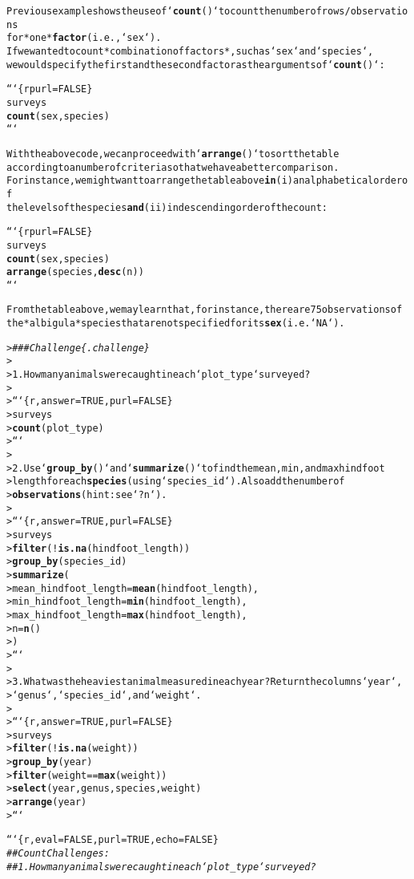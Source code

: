 \documentclass{article}\usepackage[]{graphicx}\usepackage[]{xcolor}
\makeatletter
\newcommand{\hlcom}[1]{\textcolor[rgb]{0.678,0.584,0.686}{\textit{#1}}}%
\newcommand{\hlkwd}[1]{\textcolor[rgb]{0.737,0.353,0.396}{\textbf{#1}}}%
\newenvironment{kframe}{%
 \def\at@end@of@kframe{}%
 \ifinner\ifhmode%
  \def\at@end@of@kframe{\end{minipage}}%
  \begin{minipage}{\columnwidth}%
 \fi\fi%
 \def\FrameCommand##1{\hskip\@totalleftmargin \hskip-\fboxsep
 \colorbox{shadecolor}{##1}\hskip-\fboxsep
     \hskip-\linewidth \hskip-\@totalleftmargin \hskip\columnwidth}%
 \MakeFramed {\advance\hsize-\width
   \@totalleftmargin\z@ \linewidth\hsize
   \@setminipage}}%
 {\par\unskip\endMakeFramed%
 \at@end@of@kframe}
\newenvironment{knitrout}{}{} %
\makeatother
\begin{document}
\begin{knitrout}
\begin{kframe}
\begin{alltt}
Previous example shows the use of `\hlkwd{count}()` to count the number of rows/observations
for *one* \hlkwd{factor} (i.e., `sex`).
If we wanted to count *combination of factors*, such as `sex` and `species`,
we would specify the first and the second factor as the arguments of `\hlkwd{count}()`:

```\{r purl = FALSE\}
surveys %>%
  \hlkwd{count}(sex, species)
```

With the above code, we can proceed with `\hlkwd{arrange}()` to sort the table
according to a number of criteria so that we have a better comparison.
For instance, we might want to arrange the table above \hlkwd{in} (i) an alphabetical order of
the levels of the species \hlkwd{and} (ii) in descending order of the count:

```\{r purl = FALSE\}
surveys %>%
  \hlkwd{count}(sex, species) %>%
  \hlkwd{arrange}(species, \hlkwd{desc}(n))
```

From the table above, we may learn that, for instance, there are 75 observations of
the *albigula* species that are not specified for its \hlkwd{sex} (i.e. `NA`).

> \hlcom{### Challenge \{.challenge\}}
>
> 1. How many animals were caught in each `plot_type` surveyed?
>
> ```\{r, answer=TRUE, purl=FALSE\}
> surveys %>%
>     \hlkwd{count}(plot_type)
> ```
>
> 2. Use `\hlkwd{group_by}()` and `\hlkwd{summarize}()` to find the mean, min, and max hindfoot
> length for each \hlkwd{species} (using `species_id`). Also add the number of
> \hlkwd{observations} (hint: see `?n`).
>
> ```\{r, answer=TRUE, purl=FALSE\}
> surveys %>%
>     \hlkwd{filter}(!\hlkwd{is.na}(hindfoot_length)) %>%
>     \hlkwd{group_by}(species_id) %>%
>     \hlkwd{summarize}(
>         mean_hindfoot_length = \hlkwd{mean}(hindfoot_length),
>         min_hindfoot_length = \hlkwd{min}(hindfoot_length),
>         max_hindfoot_length = \hlkwd{max}(hindfoot_length),
>         n = \hlkwd{n}()
>     )
> ```
>
> 3. What was the heaviest animal measured in each year? Return the columns `year`,
> `genus`, `species_id`, and `weight`.
>
> ```\{r, answer=TRUE, purl=FALSE\}
> surveys %>%
>     \hlkwd{filter}(!\hlkwd{is.na}(weight)) %>%
>     \hlkwd{group_by}(year) %>%
>     \hlkwd{filter}(weight == \hlkwd{max}(weight)) %>%
>     \hlkwd{select}(year, genus, species, weight) %>%
>     \hlkwd{arrange}(year)
> ```


```\{r, eval=FALSE, purl=TRUE, echo=FALSE\}
\hlcom{## Count Challenges:}
\hlcom{##  1. How many animals were caught in each `plot_type` surveyed?}


\end{alltt}
\end{kframe}
\end{knitrout}
\end{document}
